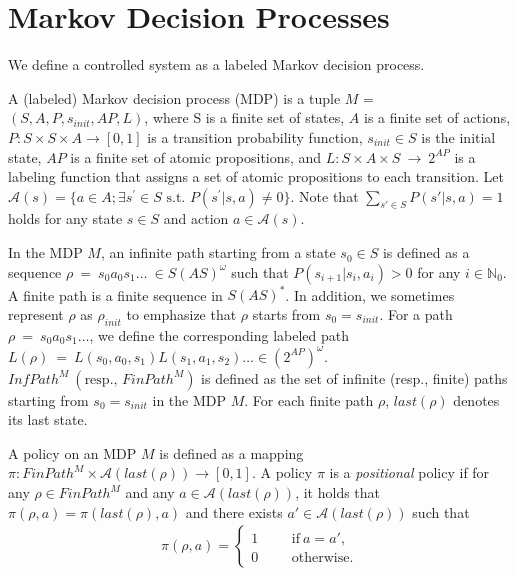 \section{Markov Decision Processes}

We define a controlled system as a labeled Markov decision process.

\begin{definition}
  A (labeled) Markov decision process (MDP) is a tuple $M$ = $(S, A, P, s_{init}, AP, L)$, where S is a finite set of states, $A$ is a finite set of actions, $P:S \times S \times A \rightarrow [0,1]$ is a transition probability function, $s_{init} \in S$ is the initial state, $AP$ is a finite set of atomic propositions, and $L : S \times A \times S\ \rightarrow\ 2^{AP}$ is a labeling function that assigns a set of atomic propositions to each transition. Let $\mathcal{A}(s) = \{ a \in A ; \exists s^{\prime} \in S \text{ s.t. } P(s^{\prime} | s,a) \neq 0 \}$. Note that $\sum_{s' \in S} P(s'|s,a) = 1$ holds for any state $s \in S$ and action $a \in \mathcal{A}(s)$.

  In the MDP $M$, an infinite path starting from a state $s_0 \in S$ is defined as a sequence $\rho\ =\ s_0a_0s_1 \ldots\ \in S (A S)^{\omega}$ such that $P(s_{i+1}|s_i, a_i) > 0$ for any $ i \in \mathbb{N}_0$. A finite path is a finite sequence in $S (A S)^{\ast}$. In addition, we sometimes represent $\rho$ as $\rho_{init}$ to emphasize that $\rho$ starts from $s_0 = s_{init}$.
  For a path $\rho\ =\ s_0a_0s_1 \ldots$, we define the corresponding labeled path $L(\rho)\ =\ L(s_0,a_0,s_1)L(s_1,a_1,s_2) \ldots \in (2^{AP})^{\omega}$. $InfPath^{M}\ ( \text{resp., }FinPath^{M})$ is defined as the set of infinite (resp., finite) paths starting from $s_0=s_{init}$ in the MDP $M$. For each finite path $\rho$, $last(\rho)$ denotes its last state.
\label{MDP}
\end{definition}

\begin{definition}[Policy]
  A policy on an MDP $M$ is defined as a mapping $\pi:FinPath^{M} \times \mathcal{A}(last(\rho)) \rightarrow [0,1]$. A policy $\pi$ is a {\it positional} policy if for any $ \rho \in FinPath^{M}$ and any $ a \in \mathcal{A}(last(\rho))$, it holds that $\pi(\rho, a)=\pi(last(\rho),a)$ and there exists $ a' \in \mathcal{A}(last(\rho))$ such that
  \begin{align*}
    \pi(\rho, a) =
    \left\{
    \begin{aligned}
      1 &   & &\text{if}\ a=a',\\
      0 &   & &\text{otherwise}.
    \end{aligned}
    \right.
  \end{align*}
\end{definition}


